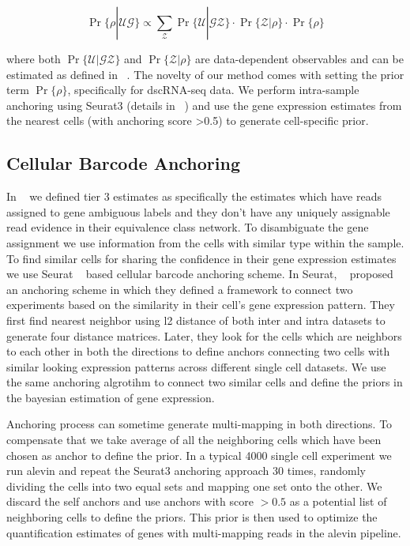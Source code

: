 \begin{equation}
	\Pr \{ \rho | \mathcal{U} \mathcal{G} \} 
	\propto \sum_{\mathcal{Z}} \Pr\{ \mathcal{U} | \mathcal{G} \mathcal{Z} \}
	\cdot \Pr\{ \mathcal{Z} | \rho \} \cdot \Pr\{ \rho \}
\end{equation}

where both $\Pr\{ \mathcal{U} | \mathcal{G} \mathcal{Z} \}$ and $\Pr\{ \mathcal{Z} | \rho \}$ are 
data-dependent observables and can be estimated as defined in ~\citet{salmon}. The novelty of our method
comes with setting the prior term $\Pr\{ \rho \}$, specifically for dscRNA-seq data. We perform
intra-sample anchoring using Seurat3 (details in ~) and use the gene expression
estimates from the nearest cells (with anchoring score >0.5) to generate cell-specific prior.

\subsection{Cellular Barcode Anchoring}
\label{subsec:anchor}
In ~ we defined tier 3 estimates as specifically the estimates which have reads assigned 
to gene ambiguous labels and they don't have any uniquely assignable read evidence in their equivalence 
class network. To disambiguate the gene assignment we use 
information from the cells with similar type within the sample. To find similar cells for sharing 
the confidence in their gene expression estimates we use Seurat ~\citep{seurat3} based cellular
barcode anchoring scheme. In Seurat, ~\citet{seurat3} proposed an anchoring scheme in which they 
defined a framework to connect two experiments based on the similarity in their cell's gene expression 
pattern. They first find nearest neighbor using l2 distance of both inter and intra datasets to generate 
four distance matrices. Later, they look for the cells which are neighbors to each other in both 
the directions to define anchors connecting two cells with similar looking expression patterns 
across different single cell datasets. We use the same anchoring algrotihm to connect two similar 
cells and define the priors in the bayesian estimation of gene expression.

Anchoring process can sometime generate multi-mapping in both directions. To compensate that we take average 
of all the neighboring cells which have been chosen as anchor to define the prior. In a typical 4000 single 
cell experiment we run alevin and repeat the Seurat3 anchoring approach $30$ times, randomly dividing 
the cells into two equal sets and mapping one set onto the other. We discard the self anchors and use 
anchors with score $>0.5$ as a potential list of neighboring cells to define the priors. This prior 
is then used to optimize the quantification estimates of genes with multi-mapping reads in the alevin 
pipeline.

